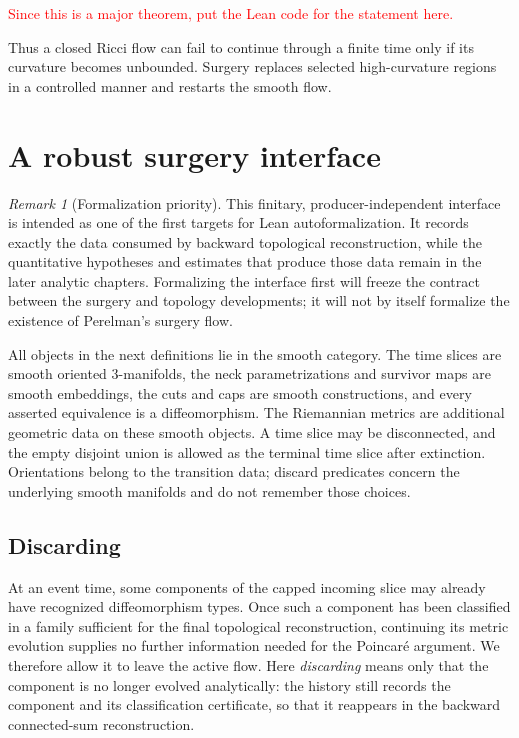 \documentclass[10pt]{coll-l}
\theoremstyle{definition}
\theoremstyle{remark}
\newtheorem{remark}[theorem]{Remark}
\numberwithin{section}{chapter}
\numberwithin{equation}{chapter}
\begin{document}
\textcolor{red}{Since this is a major theorem, put the Lean code for the statement here.}

Thus a closed Ricci flow can fail to continue through a finite time only if
its curvature becomes unbounded.  Surgery replaces selected high-curvature
regions in a controlled manner and restarts the smooth flow.

\section{A robust surgery interface}
\label{sec:surgery-interface}

\begin{remark}[Formalization priority]
This finitary, producer-independent interface is intended as one of the
first targets for Lean autoformalization.  It records exactly the data
consumed by backward topological reconstruction, while the quantitative
hypotheses and estimates that produce those data remain in the later
analytic chapters.  Formalizing the interface first will freeze the contract
between the surgery and topology developments; it will not by itself
formalize the existence of Perelman's surgery flow.
\end{remark}

All objects in the next definitions lie in the smooth category.  The time
slices are smooth oriented $3$-manifolds, the neck parametrizations and
survivor maps are smooth embeddings, the cuts and caps are smooth
constructions, and every asserted equivalence is a diffeomorphism.  The
Riemannian metrics are additional geometric data on these smooth objects.
A time slice may be disconnected, and the empty disjoint union is allowed as
the terminal time slice after extinction.  Orientations belong to the
transition data; discard predicates concern the underlying smooth manifolds
and do not remember those choices.

\subsection{Discarding}

At an event time, some components of the capped incoming slice may already
have recognized diffeomorphism types.  Once such a component has been
classified in a family sufficient for the final topological reconstruction,
continuing its metric evolution supplies no further information needed for
the Poincar\'e argument.  We therefore allow it to leave the active flow.
Here \emph{discarding} means only that the component is no longer evolved
analytically: the history still records the component and its classification
certificate, so that it reappears in the backward connected-sum
reconstruction.
\end{document}
